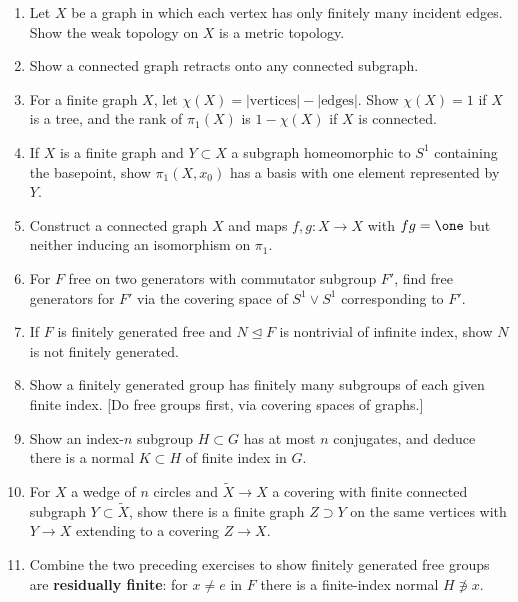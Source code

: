 \begin{enumerate}
\item Let $X$ be a graph in which each vertex has only finitely many incident
edges. Show the weak topology on $X$ is a metric topology.

\item Show a connected graph retracts onto any connected subgraph.

\item For a finite graph $X$, let $\chi(X) = |\text{vertices}|-|\text{edges}|$. Show
$\chi(X)=1$ if $X$ is a tree, and the rank of $\pi_1(X)$ is $1-\chi(X)$ if $X$ is connected.

\item If $X$ is a finite graph and $Y\subset X$ a subgraph homeomorphic to $S^1$
containing the basepoint, show $\pi_1(X,x_0)$ has a basis with one element
represented by $Y$.

\item Construct a connected graph $X$ and maps $f,g:X\to X$ with $fg=\one$ but
neither inducing an isomorphism on $\pi_1$.

\item For $F$ free on two generators with commutator subgroup $F'$, find free
generators for $F'$ via the covering space of $S^1\vee S^1$ corresponding to $F'$.

\item If $F$ is finitely generated free and $N\trianglelefteq F$ is nontrivial of infinite
index, show $N$ is not finitely generated.

\item Show a finitely generated group has finitely many subgroups of each given
finite index. [Do free groups first, via covering spaces of graphs.]

\item Show an index-$n$ subgroup $H\subset G$ has at most $n$ conjugates, and
deduce there is a normal $K\subset H$ of finite index in $G$.

\item For $X$ a wedge of $n$ circles and $\tilde X\to X$ a covering with finite connected
subgraph $Y\subset\tilde X$, show there is a finite graph $Z\supset Y$ on the same vertices
with $Y\to X$ extending to a covering $Z\to X$.

\item Combine the two preceding exercises to show finitely generated free groups
are \textbf{residually finite}: for $x\ne e$ in $F$ there is a finite-index normal
$H\not\ni x$.


\end{enumerate}
